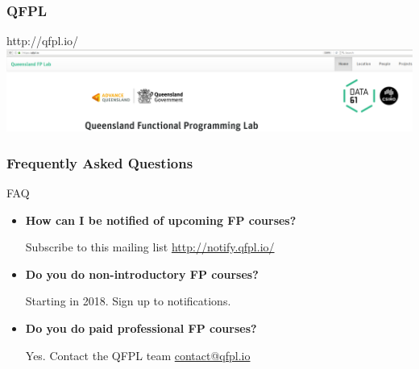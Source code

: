 \begin{frame}
\frametitle{QFPL}
\begin{block}{http://qfpl.io/}
\includegraphics[height=0.24\textheight]{image/qfpl-io.png}
\end{block}
\end{frame}

\begin{frame}
\frametitle{Frequently Asked Questions}
\begin{block}{FAQ}
\begin{itemize}
\item<1-> \textbf{How can I be notified of upcoming FP courses?}

  Subscribe to this mailing list \url{http://notify.qfpl.io/}
\item<2-> \textbf{Do you do non-introductory FP courses?}

  Starting in 2018. Sign up to notifications.
\item<3-> \textbf{Do you do paid professional FP courses?}

  Yes. Contact the QFPL team \href{mailto:contact@qfpl.io}{contact@qfpl.io}
\end{itemize}
\end{block}
\end{frame}
